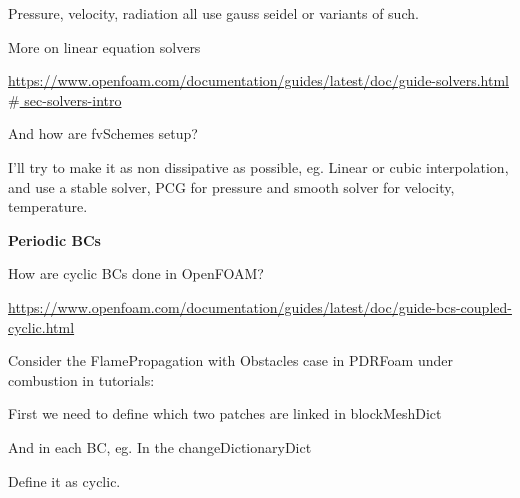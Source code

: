 \documentclass[12pt]{article}
\renewcommand{\_}{\kern-1.5pt\textunderscore\kern-1.5pt}
\begin{document}
\par

Pressure, velocity, radiation all use gauss seidel or variants of such.\par

More on linear equation solvers\par

\href{https://www.openfoam.com/documentation/guides/latest/doc/guide-solvers.html}{https://www.openfoam.com/documentation/guides/latest/doc/guide-solvers.html$\#$ sec-solvers-intro}\par


\vspace{\baselineskip}
And how are fvSchemes setup?\par


\vspace{\baselineskip}
\par

I’ll try to make it as non dissipative as possible, eg. Linear or cubic interpolation, and use a stable solver, PCG for pressure and smooth solver for velocity, temperature.\par



\textbf{Periodic BCs}\par

How are cyclic BCs done in OpenFOAM?\par

\href{https://www.openfoam.com/documentation/guides/latest/doc/guide-bcs-coupled-cyclic.html}{https://www.openfoam.com/documentation/guides/latest/doc/guide-bcs-coupled-cyclic.html}\par

Consider the FlamePropagation with Obstacles case in PDRFoam under combustion in tutorials:\par

\par


\vspace{\baselineskip}
First we need to define which two patches are linked in blockMeshDict\par

\par

And in each BC, eg. In the changeDictionaryDict\par

\par

Define it as cyclic.\par
\end{document}
